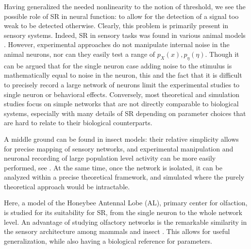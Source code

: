 Having generalized the needed nonlinearity to the notion of threshold, we see the possible role of SR in neural function: to allow for the detection of a signal too weak to be detected otherwise. 
Clearly, this problem is primarily present in sensory systems. 
Indeed, SR in sensory tasks was found in various animal models \cite{douglassNoiseEnhancementInformation1993,collinsNoiseenhancedInformationTransmission1996,levinBroadbandNeuralEncoding1996,curcioDoubleStochasticResonance2025,nodaStochasticResonanceSparse2024}. 
However, experimental approaches do not manipulate internal noise in the animal neurons, nor can they easily test a range of $p_X(x),p_\eta(\eta)$. 
Though it can be argued that for the single neuron case adding noise to the stimulus is mathematically equal to noise in the neuron, this and the fact that it is difficult to precisely record a large network of neurons limit the experimental studies to single neuron or behavioral effects. 
Conversely, most theoretical and simulation studies focus on simple networks that are not directly comparable to biological systems, especially with many details of SR depending on parameter choices that are hard to relate to their biological counterparts.

A middle ground can be found in insect models: their relative simplicity allows for precise mapping of sensory networks, and experimental manipulation and neuronal recording of large population level activity can be more easily performed, see . 
At the same time, once the network is isolated, it can be analyzed within a precise theoretical framework, and simulated where the purely theoretical approach would be intractable. %

Here, a model of the Honeybee Antennal Lobe (AL), primary center for olfaction, is studied for its suitability for SR, from the single neuron to the whole network level. 
An advantage of studying olfactory networks is the remarkable similarity in the sensory architecture among mammals and insect \cite{galiziaParallelOlfactorySystems2010,acheOlfactionDiverseSpecies2005,suOlfactoryPerceptionReceptors2009,kauppOlfactorySignallingVertebrates2010}. 
This allows for useful generalization, while also having a biological reference for parameters.
